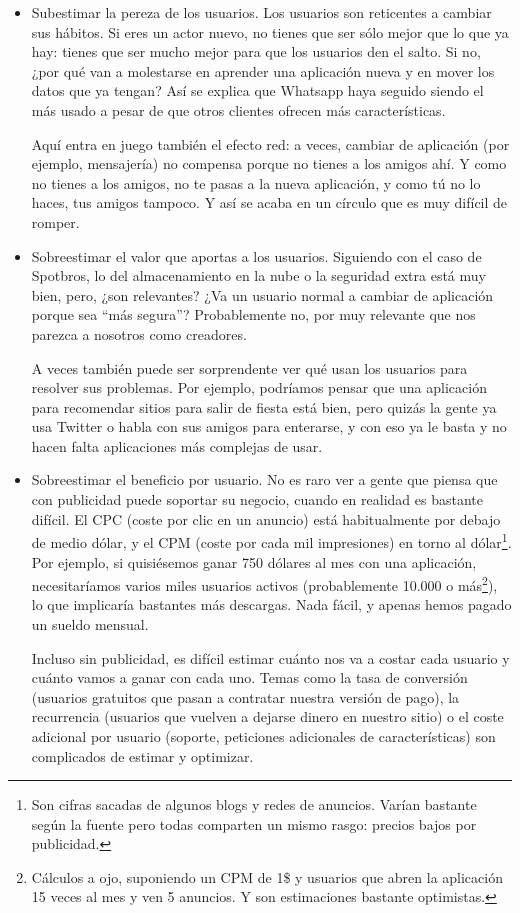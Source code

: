\documentclass[nochap,palatino,shortheader]{apuntes}
\begin{document}
\begin{itemize}
\item Subestimar la pereza de los usuarios. Los usuarios son reticentes a cambiar sus hábitos. Si eres un actor nuevo, no tienes que ser sólo mejor que lo que ya hay: tienes que ser mucho mejor para que los usuarios den el salto. Si no, ¿por qué van a molestarse en aprender una aplicación nueva y en mover los datos que ya tengan? Así se explica que Whatsapp haya seguido siendo el más usado a pesar de que otros clientes ofrecen más características.

Aquí entra en juego también el efecto red: a veces, cambiar de aplicación (por ejemplo, mensajería) no compensa porque no tienes a los amigos ahí. Y como no tienes a los amigos, no te pasas a la nueva aplicación, y como tú no lo haces, tus amigos tampoco. Y así se acaba en un círculo que es muy difícil de romper.

\item Sobreestimar el valor que aportas a los usuarios. Siguiendo con el caso de Spotbros, lo del almacenamiento en la nube o la seguridad extra está muy bien, pero, ¿son relevantes? ¿Va un usuario normal a cambiar de aplicación porque sea ``más segura''? Probablemente no, por muy relevante que nos parezca a nosotros como creadores.

A veces también puede ser sorprendente ver qué usan los usuarios para resolver sus problemas. Por ejemplo, podríamos pensar que una aplicación para recomendar sitios para salir de fiesta está bien, pero quizás la gente ya usa Twitter o habla con sus amigos para enterarse, y con eso ya le basta y no hacen falta aplicaciones más complejas de usar.

\item Sobreestimar el beneficio por usuario. No es raro ver a gente que piensa que con publicidad puede soportar su negocio, cuando en realidad es bastante difícil. El CPC (coste por clic en un anuncio) está habitualmente por debajo de medio dólar, y el CPM (coste por cada mil impresiones) en torno al dólar\footnote{Son cifras sacadas de algunos blogs y redes de anuncios. Varían bastante según la fuente pero todas comparten un mismo rasgo: precios bajos por publicidad.}. Por ejemplo, si quisiésemos ganar 750 dólares al mes con una aplicación, necesitaríamos varios miles usuarios activos (probablemente 10.000 o más\footnote{Cálculos a ojo, suponiendo un CPM de 1\$ y usuarios que abren la aplicación 15 veces al mes y ven 5 anuncios. Y son estimaciones bastante optimistas.}), lo que implicaría bastantes más descargas. Nada fácil, y apenas hemos pagado un sueldo mensual.

Incluso sin publicidad, es difícil estimar cuánto nos va a costar cada usuario y cuánto vamos a ganar con cada uno. Temas como la tasa de conversión (usuarios gratuitos que pasan a contratar nuestra versión de pago), la recurrencia (usuarios que vuelven a dejarse dinero en nuestro sitio) o el coste adicional por usuario (soporte, peticiones adicionales de características) son complicados de estimar y optimizar.
\end{itemize}
\end{document}
